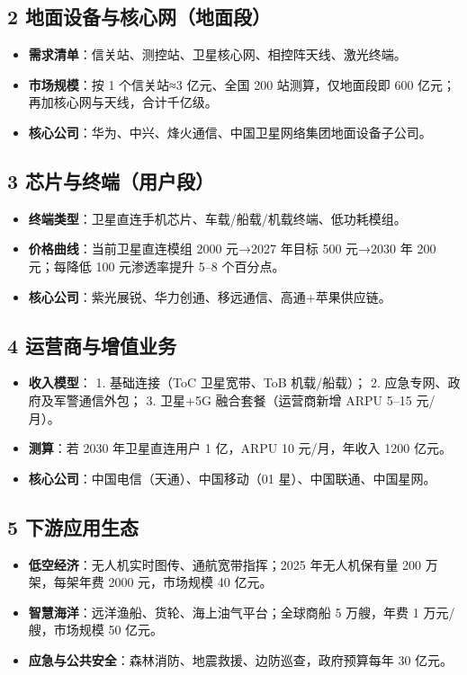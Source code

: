 \subsection{2 地面设备与核心网（地面段）}
\begin{itemize}
  \item \textbf{需求清单}：信关站、测控站、卫星核心网、相控阵天线、激光终端。  
  \item \textbf{市场规模}：按 1 个信关站≈3 亿元、全国 200 站测算，仅地面段即 600 亿元；再加核心网与天线，合计千亿级。  
  \item \textbf{核心公司}：华为、中兴、烽火通信、中国卫星网络集团地面设备子公司。  
\end{itemize}

\subsection{3 芯片与终端（用户段）}
\begin{itemize}
  \item \textbf{终端类型}：卫星直连手机芯片、车载/船载/机载终端、低功耗模组。  
  \item \textbf{价格曲线}：当前卫星直连模组 2000 元→2027 年目标 500 元→2030 年 200 元；每降低 100 元渗透率提升 5–8 个百分点。  
  \item \textbf{核心公司}：紫光展锐、华力创通、移远通信、高通+苹果供应链。  
\end{itemize}

\subsection{4 运营商与增值业务}
\begin{itemize}
  \item \textbf{收入模型}：  
  1. 基础连接（ToC 卫星宽带、ToB 机载/船载）；  
  2. 应急专网、政府及军警通信外包；  
  3. 卫星+5G 融合套餐（运营商新增 ARPU 5–15 元/月）。  
  \item \textbf{测算}：若 2030 年卫星直连用户 1 亿，ARPU 10 元/月，年收入 1200 亿元。  
  \item \textbf{核心公司}：中国电信（天通）、中国移动（01 星）、中国联通、中国星网。  
\end{itemize}

\subsection{5 下游应用生态}
\begin{itemize}
  \item \textbf{低空经济}：无人机实时图传、通航宽带指挥；2025 年无人机保有量 200 万架，每架年费 2000 元，市场规模 40 亿元。  
  \item \textbf{智慧海洋}：远洋渔船、货轮、海上油气平台；全球商船 5 万艘，年费 1 万元/艘，市场规模 50 亿元。  
  \item \textbf{应急与公共安全}：森林消防、地震救援、边防巡查，政府预算每年 30 亿元。  
\end{itemize}

